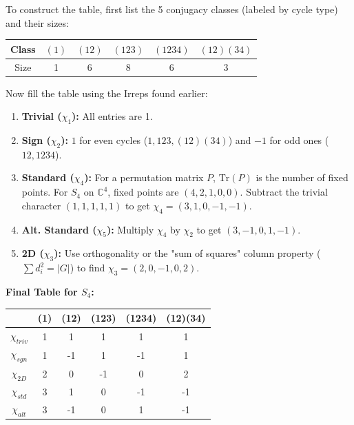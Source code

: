 \begin{example}
To construct the table, first list the 5 conjugacy classes (labeled by cycle type) and their sizes:
\begin{center}
\begin{tabular}{|c|c|c|c|c|c|}
\hline
Class & $(1)$ & $(12)$ & $(123)$ & $(1234)$ & $(12)(34)$ \\ \hline
Size & 1 & 6 & 8 & 6 & 3 \\ \hline
\end{tabular}
\end{center}

Now fill the table using the Irreps found earlier:
\begin{enumerate}
    \item \textbf{Trivial ($\chi_1$):} All entries are 1.
    \item \textbf{Sign ($\chi_2$):} $1$ for even cycles ($1, 123, (12)(34)$) and $-1$ for odd ones ($12, 1234$).
    \item \textbf{Standard ($\chi_4$):} For a permutation matrix $P$, $\text{Tr}(P)$ is the number of fixed points. For $S_4$ on $\mathbb{C}^4$, fixed points are $(4, 2, 1, 0, 0)$. Subtract the trivial character $(1, 1, 1, 1, 1)$ to get $\chi_4 = (3, 1, 0, -1, -1)$.
    \item \textbf{Alt. Standard ($\chi_5$):} Multiply $\chi_4$ by $\chi_2$ to get $(3, -1, 0, 1, -1)$.
    \item \textbf{2D ($\chi_3$):} Use orthogonality or the "sum of squares" column property ($\sum d_i^2 = |G|$) to find $\chi_3 = (2, 0, -1, 0, 2)$.
\end{enumerate}

\textbf{Final Table for $S_4$:}\newline
\begin{center}
\begin{tabular}{c|ccccc}
 & (1) & (12) & (123) & (1234) & (12)(34) \\ \hline
$\chi_{triv}$ & 1 & 1 & 1 & 1 & 1 \\
$\chi_{sgn}$ & 1 & -1 & 1 & -1 & 1 \\
$\chi_{2D}$ & 2 & 0 & -1 & 0 & 2 \\
$\chi_{std}$ & 3 & 1 & 0 & -1 & -1 \\
$\chi_{alt}$ & 3 & -1 & 0 & 1 & -1 \\
\end{tabular}
\end{center}
\end{example}

